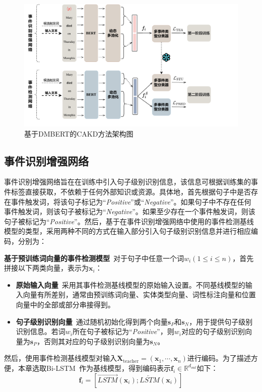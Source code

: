 \begin{figure}[htp]
    \centering
   \includegraphics[width=1\linewidth]{figures/chap3/framework_cakd.pdf}
   \caption{基于DMBERT的CAKD方法架构图}
   \label{framework_cakd}
\end{figure}

\subsection{事件识别增强网络}

事件识别增强网络旨在在训练中引入句子级别识别信息，该信息可根据训练集的事件标签直接获取，不依赖于任何外部知识或资源。具体地，首先根据句子中是否存在事件触发词，将该句子标记为“\emph{Positive}”或“\emph{Negative}”。如果句子中不存在任何事件触发词，则该句子被标记为“\emph{Negative}”。如果至少存在一个事件触发词，则该句子被标记为“\emph{Positive}”。然后，基于在事件识别增强网络中使用的事件检测基线模型的类型，采用两种不同的方式在输入部分引入句子级别识别信息并进行相应编码，分别为：

\textbf{基于预训练词向量的事件检测模型}~对于句子中任意一个词$w_{i} \left(1 \leq i \leq n\right)$，首先拼接以下两类向量，表示为$\boldsymbol{x}_{i}$：
\begin{itemize}
    \item \textbf{原始输入向量}~采用其事件检测基线模型的原始输入设置。不同基线模型的输入向量有所差别，通常由预训练词向量、实体类型向量、词性标注向量和位置向量中的全部或部分串接得到。
    \item \textbf{句子级别识别向量}~通过随机初始化得到两个向量$\boldsymbol{s}_P$和$\boldsymbol{s}_N$，用于提供句子级别识别信息。若词$w_{i}$所在句子被标记为“\emph{Positive}”，则$w_{i}$对应的句子级别识别向量为$\boldsymbol{s}_P$，否则其对应的句子级别识别向量为$\boldsymbol{s}_N$。
\end{itemize}
然后，使用事件检测基线模型对输入$\boldsymbol{X}_\textrm{teacher} = (\boldsymbol{x}_{1}, \cdots, \boldsymbol{x}_{n})$进行编码。为了描述方便，本章选取Bi-LSTM~\cite{hochreiter1997long}作为基线模型，得到编码表示$\boldsymbol{f}_i \in {\mathbb{R}}^{d_{out}}$如下：
\begin{equation}
\label{eq3_1}
\boldsymbol{f}_i=\left[\overrightarrow{LSTM}\left(\boldsymbol{x}_{i}\right) ; \overleftarrow{LSTM}\left(\boldsymbol{x}_{i}\right)\right]
\end{equation} 

